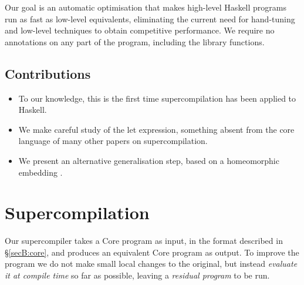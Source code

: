 Our goal is an automatic optimisation that makes high-level Haskell programs run as fast as low-level equivalents, eliminating the current need for hand-tuning and low-level techniques to obtain competitive performance. We require no annotations on any part of the program, including the library functions.

\subsection{Contributions}

\begin{itemize}
\item To our knowledge, this is the first time supercompilation has been applied to Haskell.
\item We make careful study of the let expression, something absent from the core language of many other papers on supercompilation.
\item We present an alternative generalisation step, based on a homeomorphic embedding \cite{leuschel:homeomorphic}.
\end{itemize}


\section{Supercompilation}
\label{secS:optimisation}

Our supercompiler takes a Core program as input, in the format described in \S\ref{secB:core}, and produces an equivalent Core program as output. To improve the program we do not make small local changes to the original, but instead \textit{evaluate it at compile time} so far as possible, leaving a \textit{residual program} to be run.

